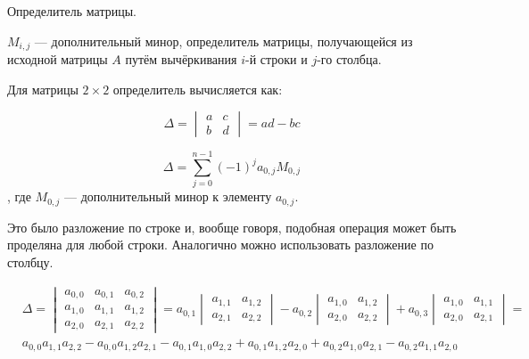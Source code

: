 Определитель матрицы.


\begin{definition}
$M_{i,j}$ --- дополнительный минор, определитель матрицы, получающейся из исходной матрицы $A$ путём вычёркивания $i$-й строки и $j$-го столбца.
\end{definition}


\begin{definition}
Для матрицы $2\times 2$ определитель вычисляется как:

$$\Delta ={\begin{vmatrix}a&c\\b&d\end{vmatrix}} = ad - bc$$

\end{definition}

\begin{definition}

$$\Delta =\sum _{j=0}^{n-1}(-1)^{j}a_{0,j}{M}_{0,j}$$
, где $M_{0,j}$ --- дополнительный минор к элементу $a_{0,j}$. 


\end{definition}

Это было разложение по строке и, вообще говоря, подобная операция может быть проделяна для любой строки.
Аналогично можно использовать разложение по столбцу.


\begin{definition}
\begin{align*}
&\Delta =
{\begin{vmatrix}
  a_{0,0}&a_{0,1}&a_{0,2}\\
  a_{1,0}&a_{1,1}&a_{1,2}\\
  a_{2,0}&a_{2,1}&a_{2,2}
 \end{vmatrix}}
 =
  a_{0,1}{\begin{vmatrix}a_{1,1}&a_{1,2}\\a_{2,1}&a_{2,2}\end{vmatrix}}
 -a_{0,2}{\begin{vmatrix}a_{1,0}&a_{1,2}\\a_{2,0}&a_{2,2}\end{vmatrix}}
 +a_{0,3}{\begin{vmatrix}a_{1,0}&a_{1,1}\\a_{2,0}&a_{2,1}\end{vmatrix}} 
 =\\
&a_{0,0}a_{1,1}a_{2,2}-a_{0,0}a_{1,2}a_{2,1}-a_{0,1}a_{1,0}a_{2,2}+a_{0,1}a_{1,2}a_{2,0}+a_{0,2}a_{1,0}a_{2,1}-a_{0,2}a_{1,1}a_{2,0}
\end{align*}
\end{definition}


